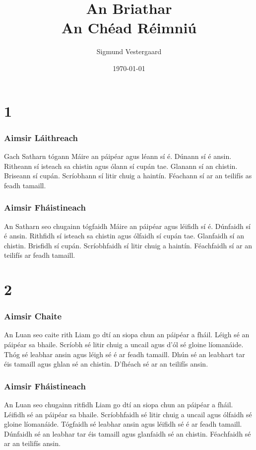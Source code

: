 \documentclass[article,a4paper,oneside,12pt]{memoir}
\title{\textbf{An Briathar} \\ \large An Ch\'{e}ad R\'{e}imniú}
\author{Sigmund Vestergaard}
\date{\today}
\begin{document}
\maketitle

\chapter*{1}
\subsection*{Aimsir Láithreach}
Gach Satharn tógann Máire an páip\'{e}ar agus
				l\'{e}ann sí \'{e}. Dúnann sí \'{e} ansin. 					Ritheann sí
				isteach sa chistin agus ólann sí cupán tae.
				Glanann sí an chistin. Briseann sí cupán.
				Scríobhann sí litir chuig a haintín.
				F\'{e}achann sí ar an teilifís as feadh
				tamaill.

\subsection*{Aimsir Fháistineach}
An Satharn seo chugainn tógfaidh Máire an
				páip\'{e}ar agus l\'{e}ifidh sí \'{e}. Dúnfaidh
				sí \'{e} ansin. Rithfidh sí isteach sa chistin 					agus
				ólfaidh sí cupán tae. Glanfaidh sí an chistin.
				Brisfidh sí cupán. Scríobhfaidh sí litir chuig
				a haintín. F\'{e}achfaidh sí ar an teilifís ar
				feadh tamaill.

\chapter*{2}
\subsection*{Aimsir Chaite}
An Luan seo caite rith Liam go dtí an siopa chun
				an páip\'{e}ar a fháil. L\'{e}igh s\'{e} an
			      páip\'{e}ar sa bhaile. Scríobh s\'{e} litir chuig a uncail agus d'ól s\'{e} gloine líomanáide. Thóg s\'{e} leabhar ansin agus l\'{e}igh s\'{e} \'{e} ar feadh tamaill. Dhún s\'{e} an leabhart tar \'{e}is tamaill agus ghlan s\'{e} an chistin. D'fh\'{e}ach s\'{e} ar an teilifís ansin.

\subsection*{Aimsir Fháistineach}
An Luan seo chugainn ritfidh Liam go dtí an siopa chun an páip\'{e}ar a fháil. L\'{e}ifidh s\'{e} an páip\'{e}ar sa bhaile. Scríobhfaidh s\'{e} litir chuig a uncail agus ólfaidh s\'{e} gloine líomanáide. Tógfaidh s\'{e} leabhar ansin agus l\'{e}ifidh s\'{e} \'{e} ar feadh tamaill. Dúnfaidh s\'{e} an leabhar tar \'{e}is tamaill agus glanfaidh s\'{e} an chistin. F\'{e}achfaidh s\'{e} ar an teilifís ansin.
\end{document}
